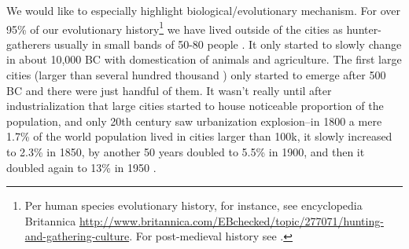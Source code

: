 \documentclass[10pt, letterpaper]{article}
\begin{document}
We would like to especially highlight biological/evolutionary mechanism.
%
For over 95\% of our evolutionary history\footnote{%
Per human species evolutionary history, for  instance, see encyclopedia Britannica
   \url{http://www.britannica.com/EBchecked/topic/277071/hunting-and-gathering-culture}. 
   For post-medieval history see \citet{white77}.%
 } we have lived outside of the cities as
hunter-gatherers usually in small bands of 50-80 people \citep{maryanski92}.
 It only started to slowly change in about 10,000 BC  with domestication of animals
 and agriculture. The first large cities (larger than several hundred thousand%
 ) only started to emerge
 after 500 BC and there were just handful of them. 
 It wasn't really
 until after industrialization that large cities started to house noticeable 
 proportion of the  population, and only 20th century saw urbanization explosion--in
 1800 a mere 1.7\% of the world population lived in cities larger than 100k, it
 slowly increased to 2.3\% in 1850, by another 50 years doubled to 5.5\% in 1900,
 and then it doubled again to 13\% in 1950 \citep{davis55}.
\end{document}

